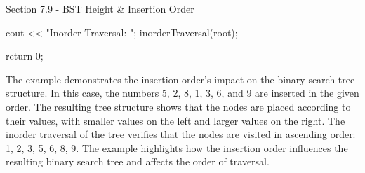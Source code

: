 \begin{notes}{Section 7.9 - BST Height \& Insertion Order}
\begin{highlight}
\begin{code}[C++]
{        cout << "Inorder Traversal: ";
        inorderTraversal(root);
    
        return 0;
    }
    \end{code}
        The example demonstrates the insertion order's impact on the binary search tree structure. In this case, the numbers 5, 2, 8, 1, 3, 6, and 9 are inserted in the given order. The resulting tree structure shows that the nodes are placed according to their values, with smaller values on the left and larger values on the right. 
        The inorder traversal of the tree verifies that the nodes are visited in ascending order: 1, 2, 3, 5, 6, 8, 9. The example highlights how the insertion order influences the resulting binary search tree and affects the order of traversal.
    \end{highlight}
\end{notes}

